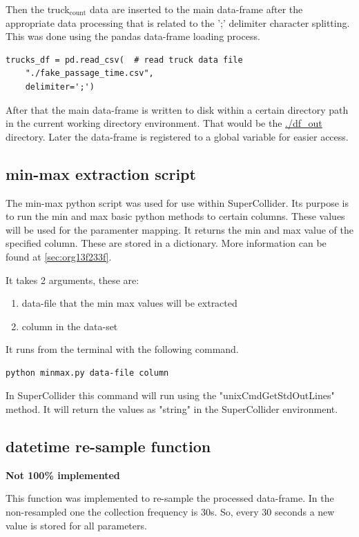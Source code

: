 \documentclass[11pt]{article}
\begin{document}
Then the truck\(_{\text{count}}\) data are inserted to the main data-frame after the appropriate data processing that is related to the ';' delimiter character splitting. This was done using the pandas data-frame loading process.

\begin{verbatim}
trucks_df = pd.read_csv(  # read truck data file
    "./fake_passage_time.csv",
    delimiter=';')
\end{verbatim}

After that the main data-frame is written to disk within a certain directory path in the current working directory environment.  That would be the \url{./df\_out} directory.
Later the data-frame is registered to a global variable for easier access.

\subsection{min-max extraction script}
\label{sec:org206d8c7}
The min-max python script was used for use within SuperCollider.  Its purpose is to run the min and max basic python methods to certain columns.  These values will be used for the paramenter mapping.  It returns the min and max value of the specified column.  These are stored in a dictionary.  More information can be found at  \ref{sec:org13f233f}.

It takes 2 arguments, these are:
\begin{enumerate}
\item data-file that the min max values will be extracted
\item column in the data-set
\end{enumerate}

It runs from the terminal with the following command.
\begin{verbatim}
python minmax.py data-file column
\end{verbatim}

In SuperCollider this command will run using the "unixCmdGetStdOutLines" method.  It will return the values as "string" in the SuperCollider environment.

\subsection{datetime re-sample function}
\label{sec:orgb480f41}
\textbf{Not 100\% implemented}

This function was implemented to re-sample the processed data-frame.  In the non-resampled one the collection frequency is 30s. So, every 30 seconds a new value is stored for all parameters.
\end{document}
